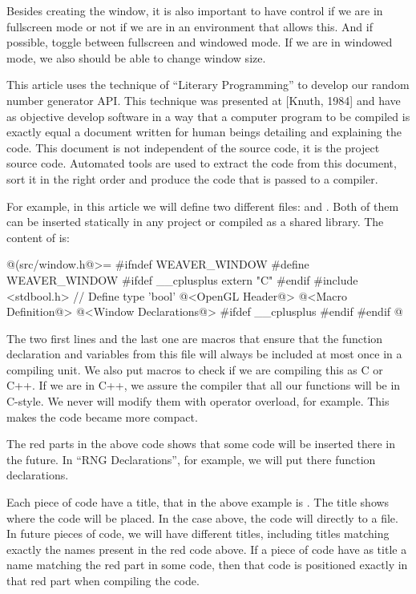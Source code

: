 Besides creating the window, it is also important to have control if
we are in fullscreen mode or not if we are in an environment that
allows this. And if possible, toggle between fullscreen and windowed
mode. If we are in windowed mode, we also should be able to change
window size.


This article uses the technique of ``Literary Programming'' to develop
our random number generator API. This technique was presented at
[Knuth, 1984] and have as objective develop software in a way that a
computer program to be compiled is exactly equal a document written
for human beings detailing and explaining the code. This document is
not independent of the source code, it is the project source
code. Automated tools are used to extract the code from this document,
sort it in the right order and produce the code that is passed to a
compiler.

For example, in this article we will define two different
files:  and . Both of them
can be inserted statically in any project or compiled as a shared
library. The content of  is:

\iniciocodigo
@(src/window.h@>=
#ifndef WEAVER_WINDOW
#define WEAVER_WINDOW
#ifdef __cplusplus
extern "C" {
#endif
#include <stdbool.h> // Define type 'bool'
@<OpenGL Header@>
@<Macro Definition@>
@<Window Declarations@>
#ifdef __cplusplus
}
#endif
#endif
@
\fimcodigo

The two first lines and the last one are macros that ensure that the
function declaration and variables from this file will always be
included at most once in a compiling unit. We also put macros to check
if we are compiling this as C or C++. If we are in C++, we assure the
compiler that all our functions will be in C-style. We never will
modify them with operator overload, for example. This makes the code
became more compact.

The red parts in the above code shows that some code will be inserted
there in the future. In ``RNG Declarations'', for example, we will put
there function declarations.

Each piece of code have a title, that in the above example is
. The title shows where the code will be placed.
In the case above, the code will directly to a file. In future pieces
of code, we will have different titles, including titles matching
exactly the names present in the red code above. If a piece of code
have as title a name matching the red part in some code, then that
code is positioned exactly in that red part when compiling the code.

